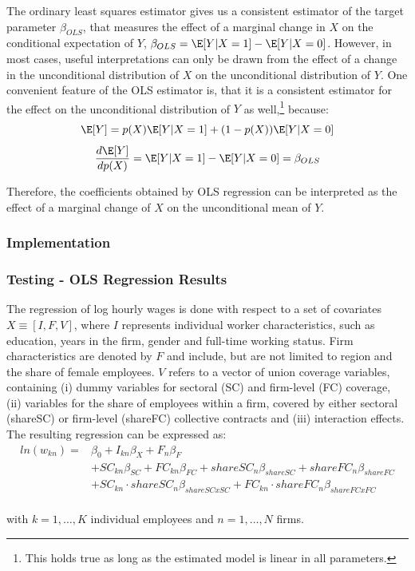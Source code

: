 The ordinary least squares estimator gives us a consistent estimator of the target parameter $\beta_{OLS}$, that measures the effect of a marginal change in $X$ on the conditional expectation of $Y$, $\beta_{OLS}=\E[Y|X=1]-\E[Y|X=0]$. However, in most cases, useful interpretations can only be drawn from the effect of a change in the unconditional distribution of $X$ on the unconditional distribution of $Y$. One convenient feature of the OLS estimator is, that it is a consistent estimator for the effect on the unconditional distribution of $Y$ as well,\footnote{ This holds true as long as the estimated model is linear in all parameters.} because:
\begin{equation}\label{2}
  \E [Y]=p(X)\E[Y|X=1]+(1-p(X))\E[Y|X=0]
\end{equation}
\begin{equation*}
  \frac{d\E[Y]}{dp(X)}=\E[Y|X=1]- \E[Y|X=0]=\beta_{OLS}
\end{equation*}

Therefore, the coefficients obtained by OLS regression can be interpreted as the effect of a marginal change of $X$ on the unconditional mean of $Y$.

\subsubsection{Implementation}

\subsubsection{Testing - OLS Regression Results}
The regression of log hourly wages is done with respect to a set of covariates $ X \equiv [I, F, V] $, where $ I $ represents individual worker characteristics, such as education, years in the firm, gender and full-time working status. Firm characteristics are denoted by $ F $ and include, but are not limited to region and the share of female employees. $V$ refers to a vector of union coverage variables, containing (i) dummy variables for sectoral (SC) and firm-level (FC) coverage, (ii) variables for the share of employees within a firm, covered by either sectoral (shareSC) or firm-level (shareFC) collective contracts and (iii) interaction effects. The resulting regression can be expressed as:
\begin{equation}\label{OLS equation}
\begin{split}
   ln(w_{kn})= &  \beta_{0}+I_{kn}\beta_{X}+F_{n}\beta_{F} \\
   & +SC_{kn}\beta_{SC}+FC_{kn}\beta_{FC}+ shareSC_{n}\beta_{shareSC} +shareFC_{n}\beta_{shareFC}\\
   &  +SC_{kn} \cdot shareSC_{n}\beta_{shareSCxSC}+FC_{kn}\cdot shareFC_{n}\beta_{shareFCxFC} \\
\end{split}
\end{equation}
\begin{center}with $k=1,\dots , K$ individual employees and $n=1,\dots , N$ firms.\end{center}

